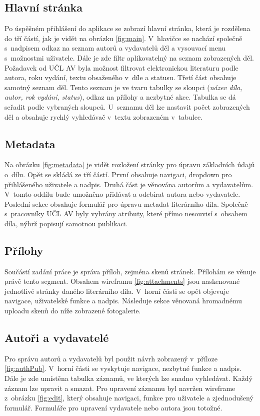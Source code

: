         \subsection{Hlavní stránka}
            Po úspěšném přihlášení do aplikace se zobrazí hlavní stránka, která je rozdělena do tří částí, jak je vidět na obrázku \ref{fig:main}. V~hlavičce se nachází společně s~nadpisem odkaz na seznam autorů a vydavatelů děl a vysouvací menu s~možnostmi uživatele. Dále je zde filtr aplikovatelný na seznam zobrazených děl. Požadavek od UČL AV byla možnost filtrovat elektronickou literaturu podle autora, roku vydání, textu obsaženého v~díle a statusu. Třetí část obsahuje samotný seznam děl. Tento seznam je ve tvaru tabulky se sloupci (\textit{název díla, autor, rok vydání, status}), odkaz na přílohy a nezbytné akce. Tabulka se dá seřadit podle vybraných sloupců. U~seznamu děl lze nastavit počet zobrazených děl a obsahuje rychlý vyhledávač v~textu zobrazeném v~tabulce.

        \subsection{Metadata}
            Na obrázku \ref{fig:metadata} je vidět rozložení stránky pro úpravu základních údajů o~dílu. Opět se skládá ze tří částí. První obsahuje navigaci, dropdown pro přihlášeného uživatele a nadpis. Druhá část je věnována autorům a vydavatelům. V~tomto oddílu bude umožněno přidávat a odebírat autora nebo vydavatele. Poslední sekce obsahuje formulář pro úpravu metadat literárního díla. Společně s~pracovníky UČL AV byly vybrány atributy, které přímo nesouvisí s~obsahem díla, nýbrž popisují samotnou publikaci. 
        
        \subsection{Přílohy}
            Součástí zadání práce je správa příloh, zejména skenů stránek. Přílohám se věnuje právě tento segment. Obsahem wireframu \ref{fig:attachments} jsou naskenované jednotlivé stránky daného literárního díla. V~horní části se opět objevuje navigace, uživatelské funkce a nadpis. Následuje sekce věnovaná hromadnému uploadu skenů do níže zobrazené fotogalerie.
            
        \subsection{Autoři a vydavatelé}
            Pro správu autorů a vydavatelů byl použit návrh zobrazený v~příloze \ref{fig:authPub}. V~horní části se vyskytuje navigace, nezbytné funkce a nadpis. Dále je zde umístěna tabulka záznamů, ve kterých lze snadno vyhledávat. Každý záznam lze upravit a smazat. Pro upravení záznamu byl navržen wireframe z~obrázku \ref{fig:edit}, který obsahuje navigaci, funkce pro uživatele a zjednodušený formulář. Formuláře pro upravení vydavatele nebo autora jsou totožné.
            
